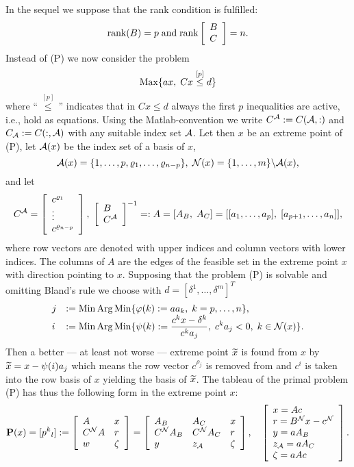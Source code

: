 %
%
In the sequel we suppose that the rank condition is fulfilled:
\[
\mbox{rank} (B) = p  \; \mbox{and} \; \mbox{rank} \ba{[}{l}B\\C \ea{]} = n.
\]
Instead of (P) we now consider the problem
%
\begin{equation} \label{8}
\Max\{ax, \; Cx \overset{[p]}{\leq} d\}
\end{equation}
%
where ``$\, \overset{[p]}{\leq} \,$'' indicates that in $Cx \leq d$ always the
first $p$ inequalities are active, i.e., hold as equations.  Using the {\sc
Matlab}-convention we write $C^{\A} := C(\A,:)$ and $C_{\A} := C(:,\A)$ with
any suitable index set $\A$.  Let then $x$ be an extreme point of (P), let
$\A(x)$ be the index set of a basis of $x$,
\[
\A(x) = \{1, \ldots,p,\rho _1, \ldots, \rho _{n-p}\}, \;
\N(x) = \{1, \ldots, m\} \backslash
\A(x),
\]
and let
\begin{equation} \label{9}
C^{\A} = \ba{[}{l} c^{\rho _1} \\ \vdots \\ c^{\rho _{n-p}}\ea{]}, \;
\ba{[}{l}B \\ C^{\A} \ea{]}^{-1} =: A = [A_B, \;  A_C] = [[a_1, \ldots, a_p],
\; [a_{p+1},\ldots, a_n]],
\end{equation}
where row vectors are denoted with upper indices and column vectors with lower
indices.  The columns of $A$ are the edges of the feasible set in the extreme
point $x$ with direction pointing to $x$.  Supposing that the problem (P) is
solvable and omitting {\sc Bland}'s rule we choose with $d = [\delta ^1,
\ldots, \delta ^m]^T$
\[ \ba{.}{ll}
j &:= \Min \Arg \Min \{\phi (k) := aa_k, \; k = p, \ldots, n\},\\

i &\dis := \Min \Arg \Min \{\psi(k) := \frac{c^kx - \delta ^k}{c^ka_j}, \;
c^ka_j < 0, \; k \in \N(x)\}.
\ea{.}
\]
Then a better --- at least not worse --- extreme point $\wi{x}$ is found from
$x$ by $ \wi{x} = x - \psi(i)a_j $ which means the row vector $c^{\rho _j}$ is
removed from and $c^i$ is taken into the row basis of $x$ yielding the basis of
$\wi{x}$.  The tableau of the primal problem (P) has thus the following form in
the extreme point $x$:
%
\begin{equation} \label{10}
{\bf P}(x) = [p^k{}_l] :=
\ba{[}{ll} A & x\\C^{\N}A & r\\w & \zeta  \ea{]}
= \ba{[}{lll} A_B & A_C & x\\
		     C^{\N}A_B & C^{\N}A_C & r\\
		     y & z_{\A} & \zeta
	   \ea{]}, \quad \ba{[}{l}x = Ac\\r = B^{\N}x - c^{\N}\\
				  y = aA_B\\ z_{\A} = aA_C\\
				  \zeta  = aAc
			 \ea{]}.
\end{equation}
